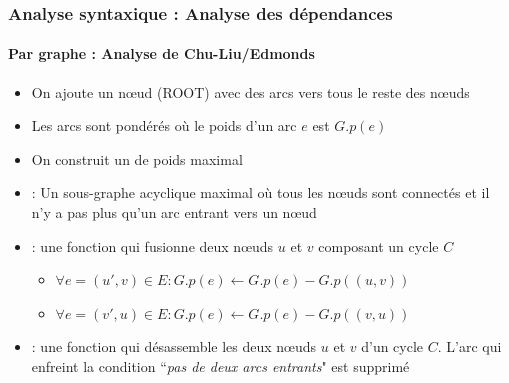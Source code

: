 \documentclass[xcolor=table]{beamer}
\begin{document}
\begin{frame}
\frametitle{Analyse syntaxique : Analyse des dépendances}
\framesubtitle{Par graphe : Analyse de Chu-Liu/Edmonds}

\begin{itemize}
	\item On ajoute un nœud (ROOT) avec des arcs vers tous le reste des nœuds 
	\item Les arcs sont pondérés où le poids d'un arc $e$ est $G.p(e)$
	\item On construit un  de poids maximal
	\item {} : Un sous-graphe acyclique maximal où tous les nœuds sont connectés et il n'y a pas plus qu'un arc entrant vers un nœud
	\item {} : une fonction qui fusionne deux nœuds $u$ et $v$ composant un cycle $C$
	\begin{itemize}
		\item $\forall e = (u', v) \in E : G.p(e) \leftarrow G.p(e) - G.p((u, v)) $
		\item $\forall e = (v', u) \in E : G.p(e) \leftarrow G.p(e) - G.p((v, u)) $
	\end{itemize}
	\item {} : une fonction qui désassemble les deux nœuds $u$ et $v$ d'un cycle $C$. L'arc qui enfreint la condition ``\textit{pas de deux arcs entrants}" est supprimé
\end{itemize}
 
\end{frame}
\end{document}
